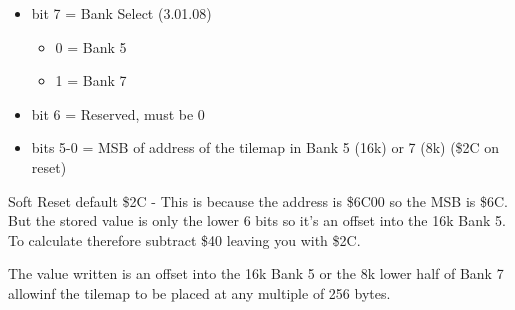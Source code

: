 \begin{itemize}
\item bit 7 = Bank Select (3.01.08)
\begin{itemize}
\item[] 0 = Bank 5
\item[] 1 = Bank 7
\end{itemize}
\item bit 6 = Reserved, must be 0
\item bits 5-0 = MSB of address of the tilemap in Bank 5 (16k) or 7 (8k)
(\$2C on reset)
\end{itemize}
Soft Reset default \$2C - This is because the address is \$6C00 so the
MSB is \$6C. But the stored value is only the lower 6 bits so it's an
offset into the 16k Bank 5. To calculate therefore subtract \$40
leaving you with \$2C.

The value written is an offset into the 16k Bank 5 or the 8k lower
half of Bank 7 allowinf the tilemap to be placed at any multiple of
256 bytes.
